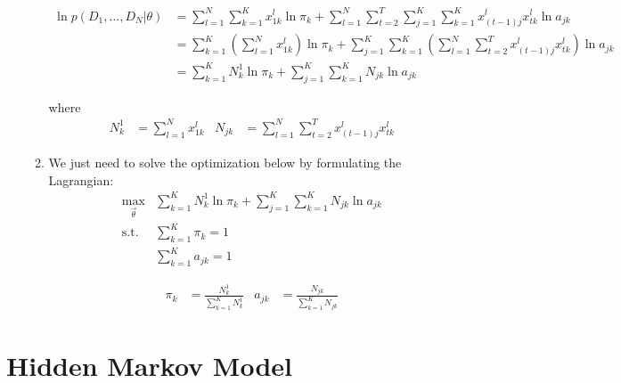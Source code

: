 \documentclass[12pt,twoside]{article}
\begin{document}
\begin{enumerate}
\begin{enumerate}
					\begin{align*}
						\ln p(D_1,\ldots, D_N\vert \theta) 
						& =\sum_{l=1}^N\sum_{k=1}^K x_{1k}^l\ln\pi_k +\sum_{l=1}^N\sum_{t=2}^T\sum_{j=1}^K \sum_{k=1}^K x^l_{(t-1)j}x^l_{tk}\ln a_{jk}\\
						& = \sum_{k=1}^K \left(\sum_{l=1}^N x_{1k}^l\right)\ln\pi_k +\sum_{j=1}^K \sum_{k=1}^K\left(\sum_{l=1}^N\sum_{t=2}^T x^l_{(t-1)j}x^l_{tk}\right)\ln a_{jk}\\
						& = \sum_{k=1}^K N_k^1 \ln \pi_k + \sum_{j=1}^K \sum_{k=1}^K N_{jk} \ln a_{jk}
					\end{align*}
					
					where 
					\begin{align*}
						N_k^1& = \sum_{l=1}^N x_{1k}^l & N_{jk}&=\sum_{l=1}^N\sum_{t=2}^T x^l_{(t-1)j}x^l_{tk}
					\end{align*}

				\item We just need to solve the optimization below by formulating the Lagrangian:
					\begin{align*}
						\max_{\vec{\theta}}	&\sum_{k=1}^K N_k^1 \ln \pi_k + \sum_{j=1}^K \sum_{k=1}^K N_{jk} \ln a_{jk}\\
						\text{s.t. }&	\sum_{k=1}^K \pi_k =1\\
										&	\sum_{k=1}^K a_{jk} = 1
					\end{align*}									
					
					\begin{align*}
						\pi_k &= \frac{N_k^1}{\sum_{k=1}^K N_k^1}	&	a_{jk} & =\frac{N_{jk}}{\sum_{k=1}^K N_{jk}}
					\end{align*}
				
			\end{enumerate}					
				
\end{enumerate}


\section{Hidden Markov Model}
\end{document}
